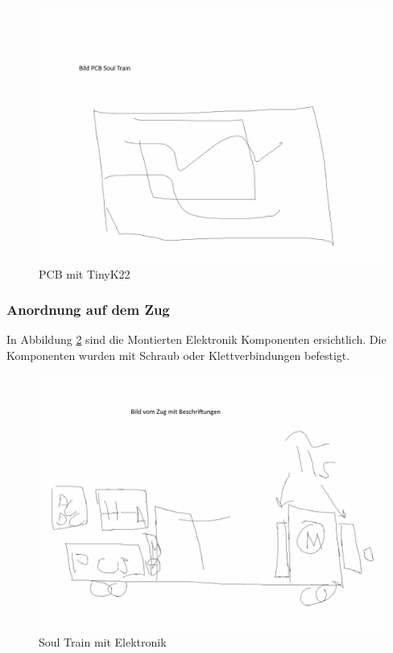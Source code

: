 \documentclass[../../main.tex]{subfiles}
\begin{document}
    \begin{figure}[H]
        \centering
        \includegraphics[width=1.0\textwidth]{../../images/et/et_pcb.jpg}
        \caption {PCB mit TinyK22}
        \label{fig:et_pcb}
    \end{figure}

    \subsubsection{Anordnung auf dem Zug} \label{et_anordnung}
    In Abbildung \ref{fig:et_anordnung} sind die Montierten Elektronik Komponenten ersichtlich. Die Komponenten wurden mit Schraub oder Klettverbindungen befestigt.\\

    \begin{figure}[H]
        \centering
        \includegraphics[width=1.0\textwidth]{../../images/et/et_anordnung_zug.jpg}
        \caption {Soul Train mit Elektronik}
        \label{fig:et_anordnung}
    \end{figure}
\end{document}
